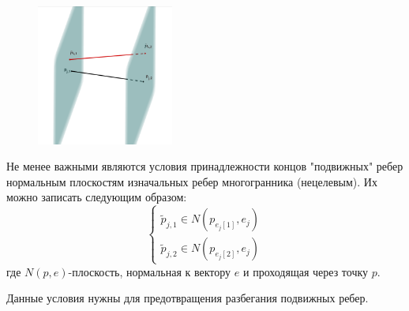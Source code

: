\documentclass[14pt,fleqn,a4paper]{scrartcl}
\begin{document}
\begin{figure} 

\includegraphics[width=0.4\textwidth]{innormalplane.png}
\end{figure}
\par
Не менее важными являются условия принадлежности концов "подвижных" ребер нормальным плоскостям изначальных ребер многогранника (нецелевым). Их можно записать следующим образом:
$$
\begin{cases}
\tilde{p}_{j,1} \in N(p_{e_{j}[1]},e_{j})\\
\tilde{p}_{j,2} \in N(p_{e_{j}[2]},e_{j})
\end{cases}
$$
где $N(p,e)$-плоскость, нормальная к вектору $e$ и проходящая через точку $p$.\par
Данные условия нужны для предотвращения разбегания подвижных ребер. 
\end{document}
